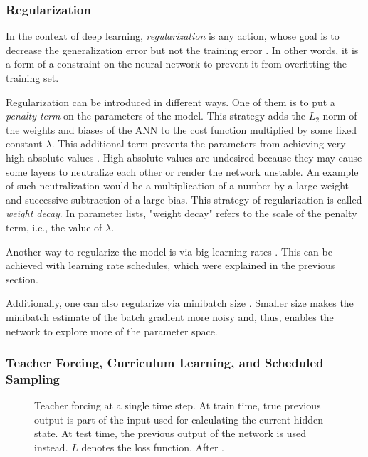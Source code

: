 \subsubsection{Regularization}
\label{subsec:regularization}

In the context of deep learning, \emph{regularization} is any action, whose goal is to decrease the generalization error but not the training error \cite{Goodfellow-et-al-2016}. In other words, it is a form of a constraint on the neural network to prevent it from overfitting the training set.

Regularization can be introduced in different ways. One of them is to put a \emph{penalty term} on the parameters of the model. This strategy adds the $L_2$ norm of the weights and biases of the \ac{ANN} to the cost function multiplied by some fixed constant $\lambda$. This additional term prevents the parameters from achieving very high absolute values \cite{Goodfellow-et-al-2016}. High absolute values are undesired because they may cause some layers to neutralize each other or render the network unstable. An example of such neutralization would be a multiplication of a number by a large weight and successive subtraction of a large bias. This strategy of regularization is called \emph{weight decay}. In parameter lists, "weight decay" refers to the scale of the penalty term, i.e., the value of $\lambda$.

Another way to regularize the model is via big learning rates \cite{Smith2018}. This can be achieved with learning rate schedules, which were explained in the previous section.

Additionally, one can also regularize via minibatch size \cite{Bengio2012}. Smaller size makes the minibatch estimate of the batch gradient more noisy and, thus, enables the network to explore more of the parameter space.

\subsubsection{Teacher Forcing, Curriculum Learning, and Scheduled Sampling}
\label{subsec:teacher_forcing}

\begin{figure}
    \centering
    \scalebox{0.6}{}
    \caption{Teacher forcing at a single time step. At train time, true previous output is part of the input used for calculating the current hidden state. At test time, the previous output of the network is used instead. $L$ denotes the loss function. After \cite{Goodfellow-et-al-2016}.}
    \label{fig:teacher_forcing}
\end{figure}

